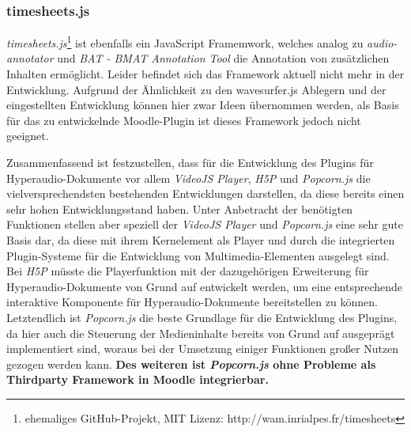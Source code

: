 \subsubsection{timesheets.js}
\textit{timesheets.js}\footnote{ehemaliges GitHub-Projekt, MIT Lizenz: http://wam.inrialpes.fr/timesheets} ist ebenfalls ein JavaScript Framemwork, welches analog zu \textit{audio-annotator} und \textit{BAT - BMAT Annotation Tool} die Annotation von zusätzlichen Inhalten ermöglicht. Leider befindet sich das Framework aktuell nicht mehr in der Entwicklung. Aufgrund der Ähnlichkeit zu den {wavesurfer.js} Ablegern und der eingestellten Entwicklung können hier zwar Ideen übernommen werden, als Basis für das zu entwickelnde Moodle-Plugin ist dieses Framework jedoch nicht geeignet.

Zusammenfassend ist festzustellen, dass für die Entwicklung des Plugins für Hyperaudio-Dokumente vor allem \textit{VideoJS Player}, \textit{H5P} und \textit{Popcorn.js} die vielversprechendsten bestehenden Entwicklungen darstellen, da diese bereits einen sehr hohen Entwicklungsstand haben. Unter Anbetracht der benötigten Funktionen stellen aber speziell der \textit{VideoJS Player} und \textit{Popcorn.js} eine sehr gute Basis dar, da diese mit ihrem Kernelement als Player und durch die integrierten Plugin-Systeme für die Entwicklung von Multimedia-Elementen ausgelegt sind. Bei \textit{H5P} müsste die Playerfunktion mit der dazugehörigen Erweiterung für Hyperaudio-Dokumente von Grund auf entwickelt werden, um eine entsprechende interaktive Komponente für Hyperaudio-Dokumente bereitstellen zu können. Letztendlich ist \textit{Popcorn.js} die beste Grundlage für die Entwicklung des Plugins, da hier auch die Steuerung der Medieninhalte bereits von Grund auf ausgeprägt implementiert sind, woraus bei der Umsetzung einiger Funktionen großer Nutzen gezogen werden kann. \textbf{Des weiteren ist \textit{Popcorn.js} ohne Probleme als Thirdparty Framework in Moodle integrierbar.}


